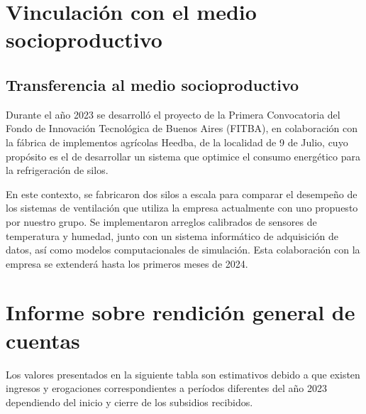 \documentclass[a4paper,11pt,twoside,final,titlepage,onecolumn,openright]{report}
\begin{document}
\chapter{Vinculación con el medio socioproductivo}

\section{Transferencia al medio socioproductivo}

Durante el año 2023 se desarrolló el proyecto de la Primera Convocatoria del Fondo de Innovación Tecnológica de Buenos Aires (FITBA), en colaboración con la fábrica de implementos agrícolas Heedba, de la localidad de 9 de Julio, cuyo propósito es el de desarrollar un sistema que optimice el consumo energético para la refrigeración de silos. 

En este contexto, se fabricaron dos silos a escala para comparar el desempeño de los sistemas de ventilación que utiliza la empresa actualmente con uno propuesto por nuestro grupo. Se implementaron arreglos calibrados de sensores de temperatura y humedad, junto con un sistema informático de adquisición de datos, así como modelos computacionales de simulación. Esta colaboración con la empresa se extenderá hasta los primeros meses de 2024.

\chapter{Informe sobre rendición general de cuentas}

Los valores presentados en la siguiente tabla son estimativos debido a que existen ingresos y erogaciones correspondientes a períodos diferentes del año 2023 dependiendo del inicio y cierre de los subsidios recibidos.
\end{document}
